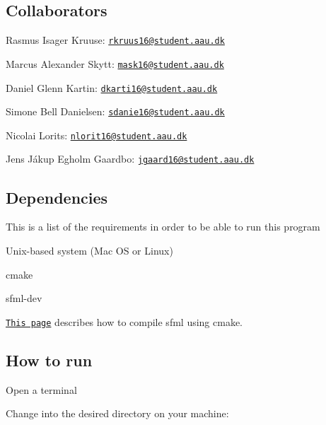 \subsection*{Collaborators}


\begin{DoxyItemize}
\item Rasmus Isager Kruuse\+: \href{mailto:rkruus16@student.aau.dk}{\tt rkruus16@student.\+aau.\+dk}
\item Marcus Alexander Skytt\+: \href{mailto:mask16@student.aau.dk}{\tt mask16@student.\+aau.\+dk}
\item Daniel Glenn Kartin\+: \href{mailto:dkarti16@student.aau.dk}{\tt dkarti16@student.\+aau.\+dk}
\item Simone Bell Danielsen\+: \href{mailto:sdanie16@student.aau.dk}{\tt sdanie16@student.\+aau.\+dk}
\item Nicolai Lorits\+: \href{mailto:nlorit16@student.aau.dk}{\tt nlorit16@student.\+aau.\+dk}
\item Jens Jákup Egholm Gaardbo\+: \href{mailto:jgaard16@student.aau.dk}{\tt jgaard16@student.\+aau.\+dk}
\end{DoxyItemize}

\subsection*{Dependencies}

This is a list of the requirements in order to be able to run this program


\begin{DoxyItemize}
\item Unix-\/based system (Mac OS or Linux)
\item cmake
\item sfml-\/dev
\end{DoxyItemize}

\href{https://www.sfml-dev.org/tutorials/2.4/compile-with-cmake.php}{\tt This page} describes how to compile sfml using cmake.

\subsection*{How to run}


\begin{DoxyEnumerate}
\item Open a terminal
\item Change into the desired directory on your machine\+:
\end{DoxyEnumerate}


